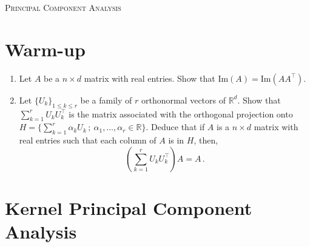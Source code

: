 \documentclass[a4paper,10pt,fleqn]{article}
\newcommand{\eqsp}{\,}
\newcommand{\rset}{\ensuremath{\mathbb{R}}}
\newcommand{\1}{\ensuremath{\mathbbm{1}}}
\newcommand{\bfA}{A}
\begin{document}

\noindent\hrulefill

\begin{center}
\textsc{Principal Component Analysis}
\end{center}
\hrulefill

\medskip


\section*{Warm-up}

\begin{enumerate}
\item Let $\bfA$ be a $n\times d$ matrix with real entries. Show that $\mathrm{Im}(\bfA)=\mathrm{Im}(\bfA \bfA^\top)$.
 \item Let $\{U_k\}_{1\leq k \leq r}$ be a family of $r$ orthonormal vectors of $\rset^d$.
Show that $\sum_{k=1}^{r} U_k U_k^\top$ is the matrix associated with the orthogonal projection onto $H=\{\sum_{k=1}^r \alpha_k U_k\,; \ \alpha_1,\ldots,\alpha_r \in \rset\}$. Deduce that if $\bfA$ is a $n\times d$ matrix with real entries such that each column of $\bfA$ is in $H$, then,
$$
\left(\sum_{k=1}^r U_k U_k^\top\right) \bfA=\bfA\eqsp.
$$
\end{enumerate}

\section*{Kernel Principal Component Analysis}
\end{document}

